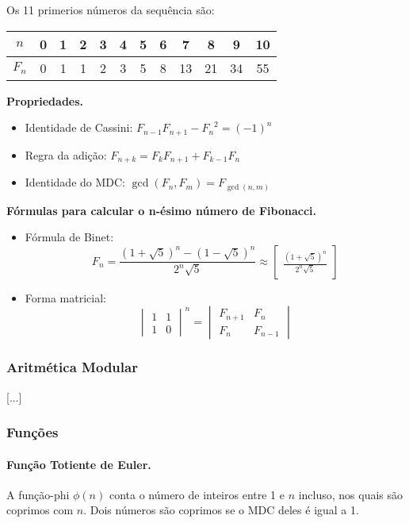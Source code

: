 Os 11 primerios números da sequência são:
\begin{center}
    \begin{tabular}{c|c c c c c c c c c c c}
        $n$ & 0 &1&2&3&4&5&6&7&8&9&10\\
        \hline
        $F_n$&0&1&1&2&3&5&8&13&21&34&55
    \end{tabular}
    
\end{center}

\textbf{Propriedades.}
\begin{itemize}
    \item Identidade de Cassini: $F_{n-1}F_{n+1}-{F_n}^2 = (-1)^n$
    \item Regra da adição: $F_{n+k} = F_kF_{n+1}+F_{k-1}F_n$
    \item Identidade do MDC: $\gcd(F_n,F_m)=F_{\gcd(n,m)}$
\end{itemize}

\textbf{Fórmulas para calcular o n-ésimo número de Fibonacci.}

\begin{itemize}
    \item Fórmula de Binet:
    $$F_n = \frac{(1+\sqrt{5})^n - (1-\sqrt{5})^n}{2^n\sqrt{5}} 
    \approx \begin{bmatrix} 
                \frac{(1+\sqrt{5})^n}{2^n\sqrt{5}}
            \end{bmatrix}$$
    \item Forma matricial: 
    $$\begin{vmatrix}
        1 & 1 \\
        1 & 0
    \end{vmatrix}^n 
    = 
    \begin{vmatrix}
        F_{n+1} & F_{n} \\
        F_{n} & F_{n-1} 
    \end{vmatrix}$$
\end{itemize}

\subsubsection{Aritmética Modular}
[...]

\subsubsection{Funções}
\paragraph{Função Totiente de Euler.} A função-phi $\phi(n)$ conta o número de inteiros entre 1 e $n$ incluso, nos quais são coprimos com $n$. Dois números são coprimos se o MDC deles é igual a 1.

